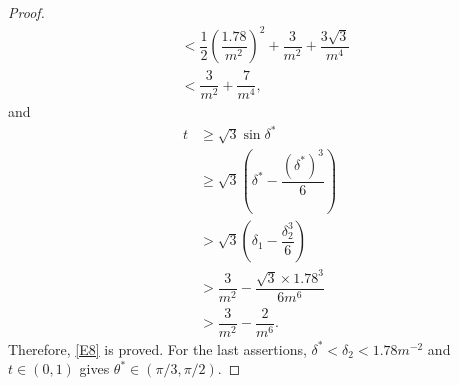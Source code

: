 \documentclass[10pt,a4paper]{amsart}
\begin{document}
\begin{proof}
\[\begin{split}
&<\dfrac{1}{2}\left(\dfrac{1.78}{m^2}\right)^2+\dfrac{3}{m^2}+\dfrac{3\sqrt{3}}{m^4}\\
&<\dfrac{3}{m^2}+\dfrac{7}{m^4},\end{split}\]
and \[\begin{split}
t&\geq \sqrt{3}\sin\delta^*\\
&\geq \sqrt{3}\left(\delta^*-\dfrac{(\delta^*)^3}{6}\right)\\
&>\sqrt{3}\left(\delta_1-\dfrac{\delta_2^3}{6}\right)\\
&>\dfrac{3}{m^2}-\dfrac{\sqrt{3}\times 1.78^3}{6m^6}\\
&>\dfrac{3}{m^2}-\dfrac{2}{m^6}.
\end{split}\]
Therefore, \eqref{E8} is proved. For the last assertions, $\delta^*<\delta_2<1.78m^{-2}$ and $t\in(0,1)$ gives $\theta^*\in (\pi/3,\pi/2)$.
\end{proof}
\end{document}
